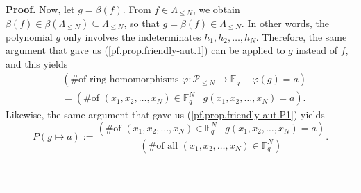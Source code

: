 \documentclass[numbers=enddot,12pt,final,onecolumn,notitlepage]{scrartcl}%
\theoremstyle{definition}
\newenvironment{proof}[1][Proof]{\noindent\textbf{#1.} }{\ \rule{0.5em}{0.5em}}
\renewcommand{\leq}{\leqslant}
\theoremstyle{plainsl}
\begin{document}
\begin{proof}
Now, let $g=\beta\left(  f\right)  $. From $f\in\Lambda_{\leq N}$, we obtain
$\beta\left(  f\right)  \in\beta\left(  \Lambda_{\leq N}\right)
\subseteq\Lambda_{\leq N}$, so that $g=\beta\left(  f\right)  \in\Lambda_{\leq
N}$. In other words, the polynomial $g$ only involves the indeterminates
$h_{1},h_{2},\ldots,h_{N}$. Therefore, the same argument that gave us
(\ref{pf.prop.friendly-aut.1}) can be applied to $g$ instead of $f$, and this
yields%
\begin{align}
& \left(  \text{\# of ring homomorphisms }\varphi:\mathcal{P}_{\leq
N}\rightarrow\mathbb{F}_{q}\ \mid\ \varphi\left(  g\right)  =a\right)
\nonumber\\
& =\left(  \text{\# of }\left(  x_{1},x_{2},\ldots,x_{N}\right)  \in
\mathbb{F}_{q}^{N}\mid g\left(  x_{1},x_{2},\ldots,x_{N}\right)  =a\right)
.\label{pf.prop.friendly-aut.2}%
\end{align}
Likewise, the same argument that gave us (\ref{pf.prop.friendly-aut.P1})
yields%
\begin{equation}
P\left(  g\mapsto a\right)  :=\dfrac{\left(  \text{\# of }\left(  x_{1}%
,x_{2},\ldots,x_{N}\right)  \in\mathbb{F}_{q}^{N}\mid g\left(  x_{1}%
,x_{2},\ldots,x_{N}\right)  =a\right)  }{\left(  \text{\# of all }\left(
x_{1},x_{2},\ldots,x_{N}\right)  \in\mathbb{F}_{q}^{N}\right)  }%
.\label{pf.prop.friendly-aut.P2}%
\end{equation}



\end{proof}
\end{document}
